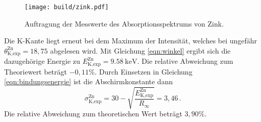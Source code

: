 \begin{figure}
  \centering
  \texttt{[image: build/zink.pdf]}
  \caption{Auftragung der Messwerte des Absorptionsspektrums von Zink.}
  \label{fig:zink}
\end{figure}

Die K-Kante liegt erneut bei dem Maximum der Intensität, welches bei ungefähr
$\theta_{\text{K,exp}}^{\text{Zn}} = 18{,}75$ abgelesen wird. Mit Gleichung \eqref{eqn:winkel} ergibt sich die dazugehörige Energie
zu $E_{\text{K,exp}}^{\text{Zn}} = \SI{9.58}{\kilo\electronvolt}$.
Die relative Abweichung zum Theoriewert beträgt $-0{,}11\%$. Durch Einsetzen in Gleichung \eqref{eqn:bindungsenergie}
ist die Abschirmkonstante dann
\begin{equation*}
  \sigma_{\text{K,exp}}^{\text{Zn}} =  30 - \sqrt{\frac{E_{\text{K,exp}}^{\text{Zn}}}{R_\infty}} = 3{,}46\,.
\end{equation*}
Die relative Abweichung zum theoretischen Wert beträgt $3{,}90\%$.
